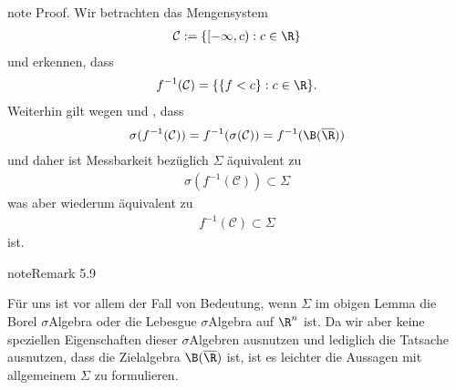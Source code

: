 \documentclass[letterpaper,10pt,german]{jupyterBook}
\begin{document}
\begin{sphinxadmonition}{note}
\sphinxAtStartPar
Proof. Wir betrachten das Mengensystem
\begin{equation*}
\begin{split}\mathcal{C}:=\{[-\infty,c):c\in\R\}\end{split}
\end{equation*}
\sphinxAtStartPar
und erkennen, dass
\begin{equation*}
\begin{split}f^{-1}(\mathcal{C}) = \{\{f<c\}:c\in\R\}.\end{split}
\end{equation*}
\sphinxAtStartPar
Weiterhin gilt wegen {\hyperref[\detokenize{masstheorie/masstheorie:lem:genborel}]{}} und {\hyperref[\detokenize{masstheorie/lebesgue_integral:lem:changesigma}]{}}, dass
\begin{equation*}
\begin{split}\sigma(f^{-1}(\mathcal{C})) = f^{-1}(\sigma(\mathcal{C})) = f^{-1}(\B(\overline{\R}))\end{split}
\end{equation*}
\sphinxAtStartPar
und daher ist Messbarkeit bezüglich \(\Sigma\) äquivalent zu
\begin{equation*}
\begin{split}\sigma(f^{-1}(\mathcal{C})) \subset \Sigma\end{split}
\end{equation*}
\sphinxAtStartPar
was aber wiederum äquivalent zu
\begin{equation*}
\begin{split}f^{-1}(\mathcal{C}) \subset \Sigma\end{split}
\end{equation*}
\sphinxAtStartPar
ist.
\end{sphinxadmonition}
\label{masstheorie/lebesgue_integral:remark-5}
\begin{sphinxadmonition}{note}{Remark 5.9}



\sphinxAtStartPar
Für uns ist vor allem der Fall von Bedeutung, wenn \(\Sigma\) im obigen Lemma die Borel \(\sigma\)\sphinxhyphen{}Algebra oder die Lebesgue \(\sigma\)\sphinxhyphen{}Algebra auf \(\R^n\) ist. Da wir aber keine speziellen Eigenschaften dieser \(\sigma\)\sphinxhyphen{}Algebren ausnutzen und lediglich die Tatsache ausnutzen, dass die Zielalgebra \(\B(\overline{\R})\) ist, ist es leichter die Aussagen mit allgemeinem \(\Sigma\) zu formulieren.
\end{sphinxadmonition}
\end{document}
